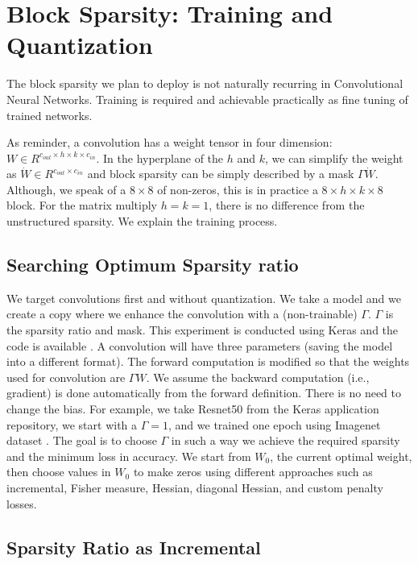 \documentclass[conference]{IEEEtran}
\begin{document}
\section{Block Sparsity: Training and Quantization}
\label{sec:training}
The block sparsity we plan to deploy is not naturally
recurring in Convolutional Neural Networks.  
Training is required and achievable practically as fine tuning of trained networks. 

As reminder, a convolution has a weight tensor in four dimension: $W
\in R^{c_{out}\times h \times k \times c_{in}}$. In the hyperplane of
the $h$ and $k$, we can simplify the weight as $\dot{W} \in R^{c_{out}
  \times c_{in}}$ and block sparsity can be simply described by a mask
$\Gamma\dot{W}$. Although, we speak of a $8\times 8$ of non-zeros,
this is in practice a $8\times h\times k\times 8$ block. For the
matrix multiply $h=k=1$, there is no difference from the unstructured
sparsity. We explain the training process.


\subsection{Searching Optimum Sparsity ratio}

We target convolutions first and without quantization. We take a model
and we create a copy where we enhance the convolution with a
(non-trainable) $\Gamma$. $\Gamma$ is the sparsity ratio and mask.
This experiment is conducted using Keras\cite{chollet2015keras} and
the code is available \cite{PaoloK2020}. A convolution will have three parameters
(saving the model into a different format).  The forward computation
is modified so that the weights used for convolution are $\Gamma
{W}$. We assume the backward computation (i.e., gradient) is done
automatically from the forward definition. There is no need to change
the bias. For example, we take Resnet50 from the Keras application
repository, we start with a $\Gamma=1$, and we trained one epoch using
Imagenet dataset \cite{deng2009imagenet}.  The goal is to choose
$\Gamma$ in such a way we achieve the required sparsity and the
minimum loss in accuracy.  We start from $W_{0}$, the current optimal
weight, then choose values in $W_{0}$ to make zeros using different
approaches such as incremental, Fisher measure, Hessian, diagonal
Hessian, and custom penalty losses.


\subsection{Sparsity Ratio as Incremental}
\end{document}

